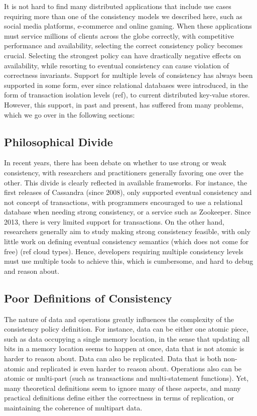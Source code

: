 It is not hard to find many distributed applications that include use cases
requiring more than one of the consistency models we described here, such as social media
platforms, e-commerce and online gaming. When these applications must service millions of
clients across the globe correctly, with competitive performance and
availability, selecting the correct consistency policy becomes crucial.
Selecting the strongest policy can have drastically negative effects on availability, while
resorting to eventual consistency can cause violation of correctness invariants.
Support for multiple levels of consistency has always been supported in some
form, ever since relational databases were introduced, in the form of
transaction isolation levels (ref), to current distributed key-value stores.
However, this support, in past and present, has suffered from many problems,
which we go over in the following sections:

\subsection{Philosophical Divide}
In recent years, there has been debate on whether to use strong or weak consistency, 
with researchers and practitioners generally favoring one over the other. This
divide is clearly reflected in available frameworks. For instance, the first
releases of Cassandra (since 2008), only supported eventual consistency and not
concept of transactions, with programmers encouraged to use a relational
database when needing strong consistency, or a service such as Zookeeper.
Since 2013, there is very limited support for transactions. On the other hand,
researchers generally aim to study making strong consistency feasible, with only
little work on defining eventual consistency semantics (which does not come for
free) (ref cloud types). Hence, developers requiring multiple
consistency levels must use multiple tools to achieve this, which is cumbersome,
and hard to debug and reason about. 

\subsection{Poor Definitions of Consistency}
The nature of data and operations
greatly influences the complexity of the consistency policy definition. For
instance, data can be either one atomic piece, such as data occupying a single
memory location, in the sense that updating all bits in a memory location seems
to happen at once, data that is not atomic is harder to reason about. Data can
also be replicated. Data that is both non-atomic and replicated is even harder
to reason about. Operations also can be atomic or multi-part (such as
transactions and multi-statement functions). Yet, many theoretical definitions
seem to ignore many of these aspects, and many practical definitions define
either the correctness in terms of replication, or maintaining the coherence of
multipart data. \\

